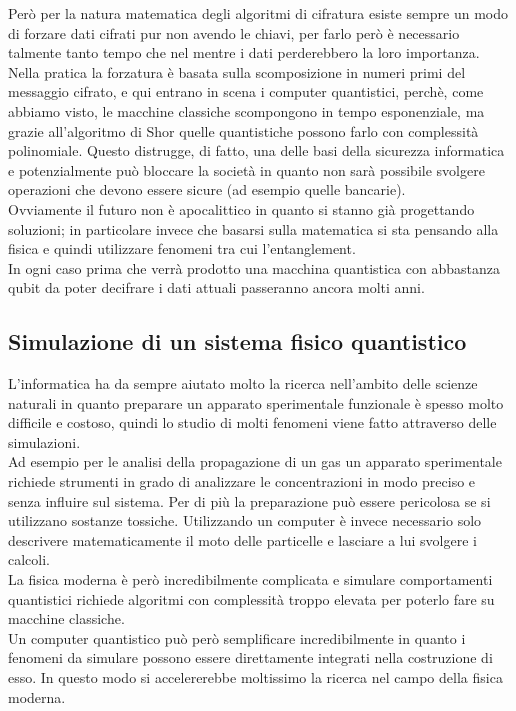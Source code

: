 Però per la natura matematica degli algoritmi di cifratura esiste sempre un modo di forzare dati cifrati pur non avendo le chiavi, per farlo però è necessario talmente tanto tempo che nel mentre i dati perderebbero la loro importanza.\\
Nella pratica la forzatura è basata sulla scomposizione in numeri primi del messaggio cifrato, e qui entrano in scena i computer quantistici, perchè, come abbiamo visto, le macchine classiche scompongono in tempo esponenziale, ma grazie all'algoritmo di Shor quelle quantistiche possono farlo con complessità polinomiale. Questo distrugge, di fatto, una delle basi della sicurezza informatica e potenzialmente può bloccare la società in quanto non sarà possibile svolgere operazioni che devono essere sicure (ad esempio quelle bancarie).\\
Ovviamente il futuro non è apocalittico in quanto si stanno già progettando soluzioni; in particolare invece che basarsi sulla matematica si sta pensando alla fisica e quindi utilizzare fenomeni tra cui l'entanglement.\\
In ogni caso prima che verrà prodotto una macchina quantistica con abbastanza qubit da poter decifrare i dati attuali passeranno ancora molti anni.
\subsection{Simulazione di un sistema fisico quantistico}
L'informatica ha da sempre aiutato molto la ricerca nell'ambito delle scienze naturali in quanto preparare un apparato sperimentale funzionale è spesso molto difficile e costoso, quindi lo studio di molti fenomeni viene fatto attraverso delle simulazioni.\\
Ad esempio per le analisi della propagazione di un gas un apparato sperimentale richiede strumenti in grado di analizzare le concentrazioni in modo preciso e senza influire sul sistema. Per di più la preparazione può essere pericolosa se si utilizzano sostanze tossiche. Utilizzando un computer è invece necessario solo descrivere matematicamente il moto delle particelle e lasciare a lui svolgere i calcoli.\\
La fisica moderna è però incredibilmente complicata e simulare comportamenti quantistici richiede algoritmi con complessità troppo elevata per poterlo fare su macchine classiche.\\
Un computer quantistico può però semplificare incredibilmente in quanto i fenomeni da simulare possono essere direttamente integrati nella costruzione di esso. In questo modo si accelererebbe moltissimo la ricerca nel campo della fisica moderna.
